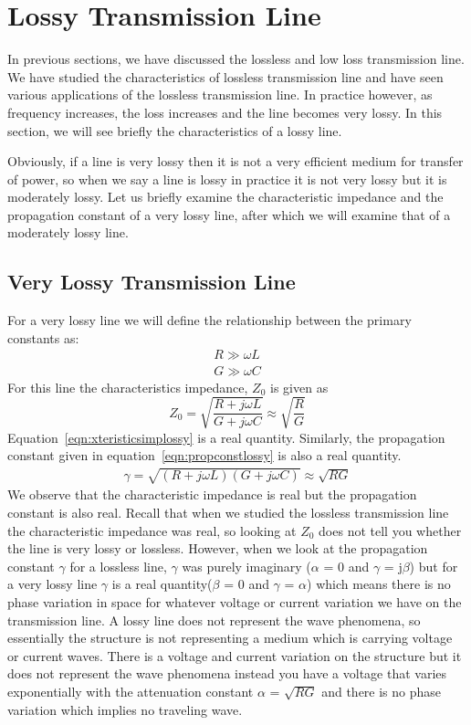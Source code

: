 \section{Lossy Transmission Line}\label{lec:lec13}
In previous sections, we have discussed the lossless and low loss transmission line. We have studied the characteristics of lossless transmission line and have seen various applications of the lossless transmission line. In practice however, as frequency increases, the loss increases and the line becomes very lossy. In this section, we will see briefly the characteristics of a lossy line.

Obviously, if a line is very lossy then it is not a very efficient medium for transfer of power, so when we say a line is lossy in practice it is not very lossy but it is moderately lossy. Let us briefly examine the characteristic impedance and the propagation constant of a very lossy line, after which we will examine that of a moderately lossy line.

\subsection{Very Lossy Transmission Line}
For a very lossy line we will define the relationship between the primary constants as:
\begin{align*}
R\gg\omega L
\\G\gg\omega C
\end{align*}
For this line the characteristics impedance, $Z_0$ is given as
\begin{dmath}
Z_0 = \sqrt{\frac{R + j\omega L}{G + j\omega C}} \approx  \sqrt{\frac{R}{G}}
\label{eqn:xteristicsimplossy}
\end{dmath}
Equation~\eqref{eqn:xteristicsimplossy} is a real quantity. Similarly, the propagation constant given in equation~\eqref{eqn:propconstlossy} is also a real quantity.
\begin{align}
\gamma = \sqrt{(R + j\omega L)(G + j\omega C)} \approx \sqrt{RG}
\label{eqn:propconstlossy}
\end{align}
We observe that the characteristic impedance is real but the propagation constant is also real. Recall that when we studied the lossless transmission line the characteristic impedance was real, so looking at $Z_0$ does not tell you whether the line is very lossy or lossless. However, when we look at the propagation constant  $\gamma$ for a lossless line, $\gamma$ was purely imaginary ($\alpha$ = 0 and $\gamma$ = j$\beta$) but for  a very lossy line $\gamma$ is a real quantity($\beta$ = 0 and $\gamma$ = $\alpha$) which means there is no phase variation in space for whatever voltage or current variation we have on the transmission line. A lossy line does not represent the wave phenomena, so essentially the structure is not representing a medium which is carrying voltage or current waves. There is a voltage and current variation on the structure but it does not represent the wave phenomena instead you have a voltage that varies exponentially with the attenuation constant $\alpha$ = $\sqrt{RG}$ and there is no phase variation which implies no traveling wave.

